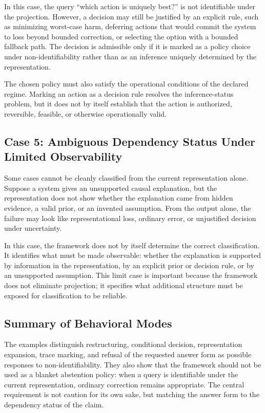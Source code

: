 \documentclass[11pt]{article}
\begin{document}
In this case, the query ``which action is uniquely best?'' is not identifiable under the projection. However, a decision may still be justified by an explicit rule, such as minimizing worst-case harm, deferring actions that would commit the system to loss beyond bounded correction, or selecting the option with a bounded fallback path. The decision is admissible only if it is marked as a policy choice under non-identifiability rather than as an inference uniquely determined by the representation.

The chosen policy must also satisfy the operational conditions of the declared regime. Marking an action as a decision rule resolves the inference-status problem, but it does not by itself establish that the action is authorized, reversible, feasible, or otherwise operationally valid.

\subsection{Case 5: Ambiguous Dependency Status Under Limited Observability}

Some cases cannot be cleanly classified from the current representation alone. Suppose a system gives an unsupported causal explanation, but the representation does not show whether the explanation came from hidden evidence, a valid prior, or an invented assumption. From the output alone, the failure may look like representational loss, ordinary error, or unjustified decision under uncertainty.

In this case, the framework does not by itself determine the correct classification. It identifies what must be made observable: whether the explanation is supported by information in the representation, by an explicit prior or decision rule, or by an unsupported assumption. This limit case is important because the framework does not eliminate projection; it specifies what additional structure must be exposed for classification to be reliable.

\subsection{Summary of Behavioral Modes}

The examples distinguish restructuring, conditional decision, representation expansion, trace marking, and refusal of the requested answer form as possible responses to non-identifiability. They also show that the framework should not be used as a blanket abstention policy: when a query is identifiable under the current representation, ordinary correction remains appropriate. The central requirement is not caution for its own sake, but matching the answer form to the dependency status of the claim.
\end{document}
